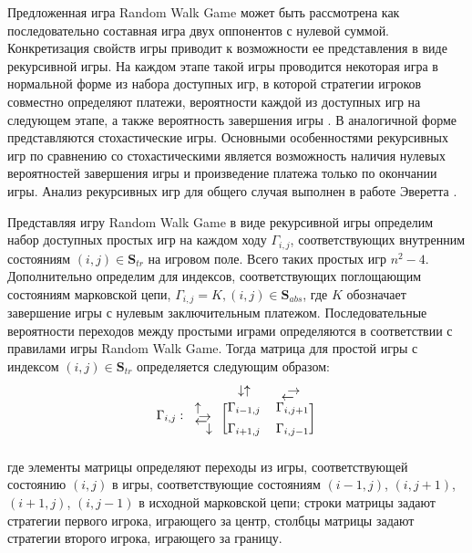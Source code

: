 Предложенная игра Random Walk Game может быть рассмотрена как последовательно составная игра двух оппонентов с нулевой суммой. Конкретизация свойств игры приводит к возможности ее представления в виде рекурсивной игры. На каждом этапе такой игры проводится некоторая игра в нормальной форме из набора доступных игр, в которой стратегии игроков совместно определяют платежи, вероятности каждой из доступных игр на следующем этапе, а также вероятность завершения игры \cite{luce_games_1957a}. В аналогичной форме представляются стохастические игры. Основными особенностями рекурсивных игр по сравнению со стохастическими является возможность наличия нулевых вероятностей завершения игры и произведение платежа только по окончании игры. Анализ рекурсивных игр для общего случая выполнен в работе Эверетта \cite{everett_recursive_1958}.

Представляя игру Random Walk Game в виде рекурсивной игры определим набор доступных простых игр на каждом ходу $\Gamma_{i,j}$, соответствующих внутренним состояниям $(i, j) \in \textbf{S}_{tr}$ на игровом поле. Всего таких простых игр $n^2-4$. Дополнительно определим для индексов, соответствующих поглощающим состояниям марковской цепи, $\Gamma_{i,j}=K, (i,j) \in \textbf{S}_{abs}$, где $K$ обозначает завершение игры с нулевым заключительным платежом. Последовательные вероятности переходов между простыми играми определяются в соответствии с правилами игры Random Walk Game. Тогда матрица для простой игры с индексом $(i, j) \in \textbf{S}_{tr}$ определяется следующим образом:
\begin{equation}
    \begin{aligned}
        \Gamma_{i,j}: \begin{blockarray}{ccc}
     & \mathbin\downarrow\hspace{-0.3em}\uparrow & \text{\makebox[2pt][l]{\raisebox{-5pt}{$\leftarrow$}}}\rightarrow \\
    \begin{block}{l[cc]}
        \text{\makebox[3pt][l]{\raisebox{0pt}{$\uparrow$}}}\text{\makebox[0pt][l]{\raisebox{-7pt}{$\rightarrow$}}} & \Gamma_{i-1,j} & \Gamma_{i,j+1} \\
        \text{\makebox[6pt][l]{\raisebox{6pt}{$\leftarrow$}}}\downarrow & \Gamma_{i+1,j} & \Gamma_{i,j-1} \\
    \end{block}
    \end{blockarray}
    \label{eq:recursive-game-transitions}
    \end{aligned}
\end{equation}
где элементы матрицы определяют переходы из игры, соответствующей состоянию $(i, j)$ в игры, соответствующие состояниям $(i-1, j)$, $(i, j+1)$, $(i+1, j)$, $(i, j-1)$ в исходной марковской цепи; строки матрицы задают стратегии первого игрока, играющего за центр, столбцы матрицы задают стратегии второго игрока, играющего за границу. 

